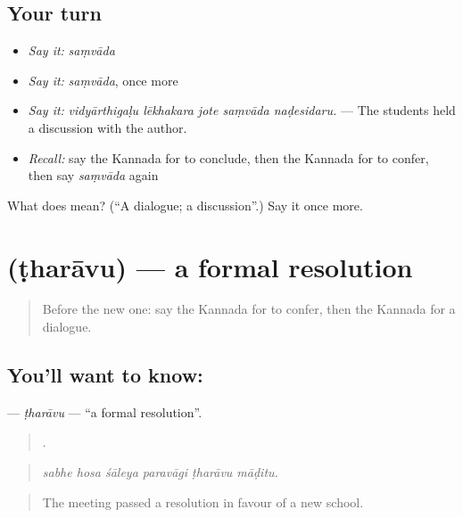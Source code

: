 \subsection*{Your turn}
\begin{itemize}
\raggedright
  \item \emph{Say it:} \emph{saṃvāda}
  \item \emph{Say it:} \emph{saṃvāda}, once more
  \item \emph{Say it:} \emph{vidyārthigaḷu lēkhakara jote saṃvāda naḍesidaru.} — The students held a discussion with the author.
  \item \emph{Recall:} say the Kannada for to conclude, then the Kannada for to confer, then say \emph{saṃvāda} again
\end{itemize}

\begin{tcolorbox}[breakable,colback=teal!4,colframe=teal!35!black,title={Before you move on}]
What does  mean? (\textquotedblleft{}A dialogue; a discussion\textquotedblright{}.) Say it once more.
\end{tcolorbox}
\section[\texorpdfstring{\kn{ಠರಾವು} (ṭharāvu)}{ಠರಾವು (ṭharāvu)}]{ (ṭharāvu) — a formal resolution}

\label{lesson:KA-C431-tharavu}



\begin{quote}
Before the new one: say the Kannada for to confer, then the Kannada for a dialogue.
\end{quote}

\subsection*{You'll want to know: }
\textbf{} — \emph{ṭharāvu} — \textquotedblleft{}a formal resolution\textquotedblright{}.

\begin{quote}
     .
\end{quote}

\begin{quote}
\emph{sabhe hosa śāleya paravāgi ṭharāvu māḍitu.}
\end{quote}

\begin{quote}
The meeting passed a resolution in favour of a new school.
\end{quote}

